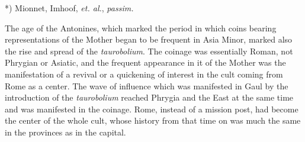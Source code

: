 \documentclass[a4paper, 11pt, oneside, polutonikogreek, english]{article}
\begin{document}
*) Mionnet, Imhoof, \emph{et. al.}, \emph{passim.}

The age of the Antonines, which marked the period in which coins bearing representations of the Mother began to be frequent in Asia Minor, marked also the rise and spread of the \emph{taurobolium}. The coinage was essentially Roman, not Phrygian or Asiatic, and the frequent appearance in it of the Mother was the manifestation of a revival or a quickening of interest in the cult coming from Rome as a center. The wave of influence which was manifested in Gaul by the introduction of the \emph{taurobolium} reached Phrygia and the East at the same time and was manifested in the coinage. Rome, instead of a mission post, had become the center of the whole cult, whose history from that time on was much the same in the provinces as in the capital.
\end{document}
